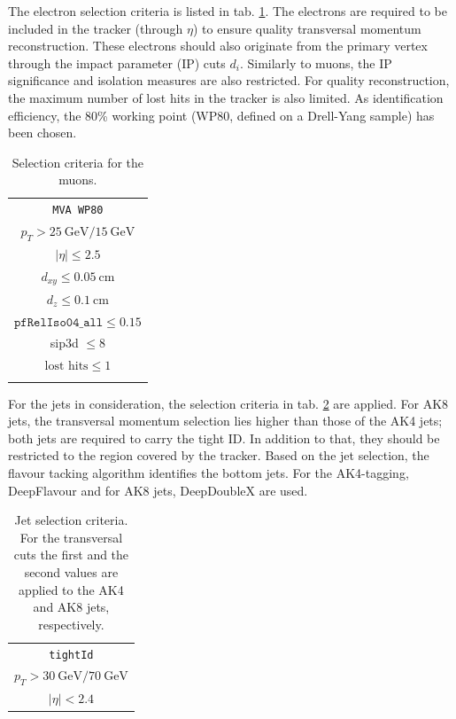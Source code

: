 The electron selection criteria is listed in tab. \ref{tab:electron_selection}. The electrons are required to be included in the tracker (through $\eta$) to ensure quality transversal momentum reconstruction. These electrons should also originate from the primary vertex through the impact parameter (IP) cuts $d_i$. Similarly to muons, the IP significance and isolation measures are also restricted. For quality reconstruction, the maximum number of lost hits in the tracker is also limited. As identification efficiency, the 80\% working point (WP80, defined on a Drell-Yang sample) has been chosen.

\begin{table}[h!]
	\centering
	\begin{tabular}{c}
		\hline
		\texttt{MVA WP80} \\
		$p_T > \SI{25}{\giga\electronvolt}/\SI{15}{\giga\electronvolt} $\\
		$|\eta| \leq 2.5$ \\
		$d_{xy} \leq \SI{0.05}{\centi\meter}$ \\
		$d_z \leq \SI{0.1}{\centi\meter}$ \\
		$\texttt{pfRelIso04\_all} \leq 0.15$  \\
		sip3d $\leq 8$ \\
		$\text{lost hits} \leq 1$ \\
		\hline \\
	\end{tabular}
	\caption{Selection criteria for the muons.}
	\label{tab:electron_selection}
\end{table}

For the jets in consideration, the selection criteria in tab. \ref{tab:jet_selection} are applied. For AK8 jets, the transversal momentum selection lies higher than those of the AK4 jets; both jets are required to carry the tight ID. In addition to that, they should be restricted to the region covered by the tracker. Based on the jet selection, the flavour tacking algorithm identifies the bottom jets. For the AK4-tagging, DeepFlavour and for AK8 jets, DeepDoubleX are used.

\begin{table}[h!]
	\centering
	\begin{tabular}{c}
		\hline
		\texttt{tightId} \\
		$p_T > \SI{30}{\giga\electronvolt}/ \SI{70}{\giga\electronvolt}$ \\
		$|\eta| < 2.4$ \\
		\hline
	\end{tabular}
	\caption{Jet selection criteria. For the transversal cuts the first and the second values are applied to the AK4 and AK8 jets, respectively.}
	\label{tab:jet_selection}
\end{table}

